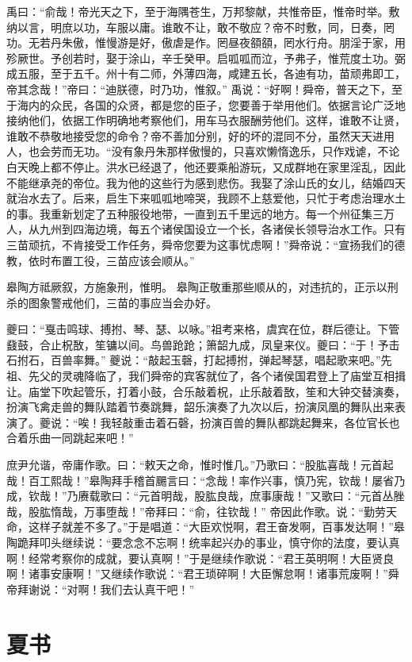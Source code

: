 \documentclass[a4paper,12pt,UTF8,twoside]{ctexbook}
\begin{document}
禹曰：“俞哉！帝光天之下，至于海隅苍生，万邦黎献，共惟帝臣，惟帝时举。敷纳以言，明庶以功，车服以庸。谁敢不让，敢不敬应？帝不时敷，同，日奏，罔功。无若丹朱傲，惟慢游是好，傲虐是作。罔昼夜頟頟，罔水行舟。朋淫于家，用殄厥世。予创若时，娶于涂山，辛壬癸甲。启呱呱而泣，予弗子，惟荒度土功。弼成五服，至于五千。州十有二师，外薄四海，咸建五长，各迪有功，苗顽弗即工，帝其念哉！”帝曰：“迪朕德，时乃功，惟叙。”
禹说：“好啊！舜帝，普天之下，至于海内的众民，各国的众贤，都是您的臣子，您要善于举用他们。依据言论广泛地接纳他们，依据工作明确地考察他们，用车马衣服酬劳他们。这样，谁敢不让贤，谁敢不恭敬地接受您的命令？帝不善加分别，好的坏的混同不分，虽然天天进用人，也会劳而无功。“没有象丹朱那样傲慢的，只喜欢懒惰逸乐，只作戏谑，不论白天晚上都不停止。洪水已经退了，他还要乘船游玩，又成群地在家里淫乱，因此不能继承尧的帝位。我为他的这些行为感到悲伤。我娶了涂山氏的女儿，结婚四天就治水去了。后来，启生下来呱呱地啼哭，我顾不上慈爱他，只忙于考虑治理水土的事。我重新划定了五种服役地带，一直到五千里远的地方。每一个州征集三万人，从九州到四海边境，每五个诸侯国设立一个长，各诸侯长领导治水工作。只有三苗顽抗，不肯接受工作任务，舜帝您要为这事忧虑啊！”舜帝说：“宣扬我们的德教，依时布置工役，三苗应该会顺从。”

皋陶方祗厥叙，方施象刑，惟明。
皋陶正敬重那些顺从的，对违抗的，正示以刑杀的图象警戒他们，三苗的事应当会办好。

夔曰：“戛击鸣球、搏拊、琴、瑟、以咏。”祖考来格，虞宾在位，群后德让。下管鼗鼓，合止柷敔，笙镛以间。鸟兽跄跄；箫韶九成，凤皇来仪。夔曰：“于！予击石拊石，百兽率舞。”
夔说：“敲起玉磬，打起搏拊，弹起琴瑟，唱起歌来吧。”先祖、先父的灵魂降临了，我们舜帝的宾客就位了，各个诸侯国君登上了庙堂互相揖让。庙堂下吹起管乐，打着小鼓，合乐敲着柷，止乐敲着敔，笙和大钟交替演奏，扮演飞禽走兽的舞队踏着节奏跳舞，韶乐演奏了九次以后，扮演凤凰的舞队出来表演了。夔说：“唉！我轻敲重击着石磬，扮演百兽的舞队都跳起舞来，各位官长也合着乐曲一同跳起来吧！”

庶尹允谐，帝庸作歌。曰：“敕天之命，惟时惟几。”乃歌曰：“股肱喜哉！元首起哉！百工熙哉！”皋陶拜手稽首颺言曰：“念哉！率作兴事，慎乃宪，钦哉！屡省乃成，钦哉！”乃赓载歌曰：“元首明哉，股肱良哉，庶事康哉！”又歌曰：“元首丛脞哉，股肱惰哉，万事堕哉！”帝拜曰：“俞，往钦哉！”
帝因此作歌。说：“勤劳天命，这样子就差不多了。”于是唱道：“大臣欢悦啊，君王奋发啊，百事发达啊！”皋陶跪拜叩头继续说：“要念念不忘啊！统率起兴办的事业，慎守你的法度，要认真啊！经常考察你的成就，要认真啊！”于是继续作歌说：“君王英明啊！大臣贤良啊！诸事安康啊！”又继续作歌说：“君王琐碎啊！大臣懈怠啊！诸事荒废啊！”舜帝拜谢说：“对啊！我们去认真干吧！”

\part{夏书}
\end{document}
